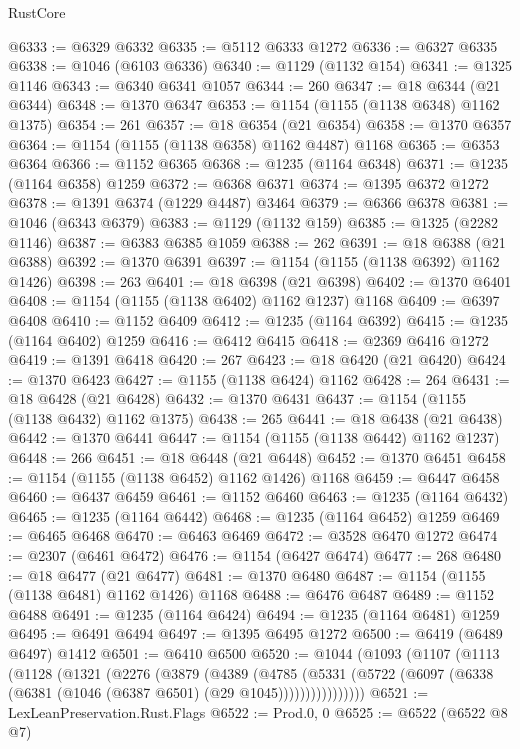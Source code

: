 \begin{lexlean}{RustCore}
\begin{coremodule}
@6333 := @6329 @6332
@6335 := @5112 @6333 @1272
@6336 := @6327 @6335
@6338 := @1046 (@6103 @6336)
@6340 := @1129 (@1132 @154)
@6341 := @1325 @1146
@6343 := @6340 @6341 @1057
@6344 := 260
@6347 := @18 @6344 (@21 @6344)
@6348 := @1370 @6347
@6353 := @1154 (@1155 (@1138 @6348) @1162 @1375)
@6354 := 261
@6357 := @18 @6354 (@21 @6354)
@6358 := @1370 @6357
@6364 := @1154 (@1155 (@1138 @6358) @1162 @4487) @1168
@6365 := @6353 @6364
@6366 := @1152 @6365
@6368 := @1235 (@1164 @6348)
@6371 := @1235 (@1164 @6358) @1259
@6372 := @6368 @6371
@6374 := @1395 @6372 @1272
@6378 := @1391 @6374 (@1229 @4487) @3464
@6379 := @6366 @6378
@6381 := @1046 (@6343 @6379)
@6383 := @1129 (@1132 @159)
@6385 := @1325 (@2282 @1146)
@6387 := @6383 @6385 @1059
@6388 := 262
@6391 := @18 @6388 (@21 @6388)
@6392 := @1370 @6391
@6397 := @1154 (@1155 (@1138 @6392) @1162 @1426)
@6398 := 263
@6401 := @18 @6398 (@21 @6398)
@6402 := @1370 @6401
@6408 := @1154 (@1155 (@1138 @6402) @1162 @1237) @1168
@6409 := @6397 @6408
@6410 := @1152 @6409
@6412 := @1235 (@1164 @6392)
@6415 := @1235 (@1164 @6402) @1259
@6416 := @6412 @6415
@6418 := @2369 @6416 @1272
@6419 := @1391 @6418
@6420 := 267
@6423 := @18 @6420 (@21 @6420)
@6424 := @1370 @6423
@6427 := @1155 (@1138 @6424) @1162
@6428 := 264
@6431 := @18 @6428 (@21 @6428)
@6432 := @1370 @6431
@6437 := @1154 (@1155 (@1138 @6432) @1162 @1375)
@6438 := 265
@6441 := @18 @6438 (@21 @6438)
@6442 := @1370 @6441
@6447 := @1154 (@1155 (@1138 @6442) @1162 @1237)
@6448 := 266
@6451 := @18 @6448 (@21 @6448)
@6452 := @1370 @6451
@6458 := @1154 (@1155 (@1138 @6452) @1162 @1426) @1168
@6459 := @6447 @6458
@6460 := @6437 @6459
@6461 := @1152 @6460
@6463 := @1235 (@1164 @6432)
@6465 := @1235 (@1164 @6442)
@6468 := @1235 (@1164 @6452) @1259
@6469 := @6465 @6468
@6470 := @6463 @6469
@6472 := @3528 @6470 @1272
@6474 := @2307 (@6461 @6472)
@6476 := @1154 (@6427 @6474)
@6477 := 268
@6480 := @18 @6477 (@21 @6477)
@6481 := @1370 @6480
@6487 := @1154 (@1155 (@1138 @6481) @1162 @1426) @1168
@6488 := @6476 @6487
@6489 := @1152 @6488
@6491 := @1235 (@1164 @6424)
@6494 := @1235 (@1164 @6481) @1259
@6495 := @6491 @6494
@6497 := @1395 @6495 @1272
@6500 := @6419 (@6489 @6497) @1412
@6501 := @6410 @6500
@6520 := @1044
    (@1093
      (@1107
        (@1113
          (@1128
            (@1321
              (@2276
                (@3879
                  (@4389
                    (@4785
                      (@5331
                        (@5722 (@6097 (@6338 (@6381 (@1046 (@6387 @6501) (@29 @1045))))))))))))))))
@6521 := LexLeanPreservation.Rust.Flags
@6522 := Prod.{0, 0}
@6525 := @6522 (@6522 @8 @7)

\end{coremodule}
\end{lexlean}

